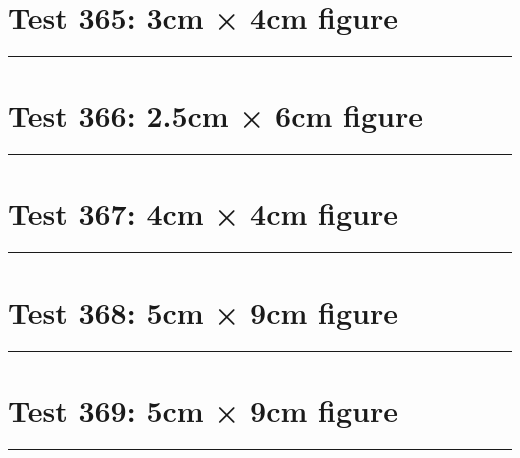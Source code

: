 \documentclass[a4paper,11pt]{article}
\begin{document}
\section*{Test 365: 3cm × 4cm figure}
\begin{swarmwrap}%
  \begin{minipage}[t]{3cm}
    \centering
    \rule{\linewidth}{4cm}
  \end{minipage}%
\end{swarmwrap}%
\swarmwrapnext
\lipsum[28]
\lipsum[29]
\lipsum[30]
\lipsum[31]
\section*{Test 366: 2.5cm × 6cm figure}
\begin{swarmwrap}%
  \begin{minipage}[t]{2cm}
    \centering
    \rule{\linewidth}{6cm}
  \end{minipage}%
\end{swarmwrap}%
\swarmwrapnext
\lipsum[46]
\lipsum[47]
\lipsum[48]
\lipsum[49]
\section*{Test 367: 4cm × 4cm figure}
\begin{swarmwrap}%
  \begin{minipage}[t]{4cm}
    \centering
    \rule{\linewidth}{4cm}
  \end{minipage}%
\end{swarmwrap}%
\swarmwrapnext
\lipsum[47]
\lipsum[48]
\lipsum[49]
\section*{Test 368: 5cm × 9cm figure}
\begin{swarmwrap}%
  \begin{minipage}[t]{5cm}
    \centering
    \rule{\linewidth}{9cm}
  \end{minipage}%
\end{swarmwrap}%
\swarmwrapnext
\lipsum[146]
\lipsum[147]
\lipsum[148]
\lipsum[149]
\lipsum[150]
\lipsum[1]
\section*{Test 369: 5cm × 9cm figure}
\begin{swarmwrap}%
  \begin{minipage}[t]{5cm}
    \centering
    \rule{\linewidth}{9cm}
  \end{minipage}%
\end{swarmwrap}%
\swarmwrapnext
\lipsum[82]
\lipsum[83]
\lipsum[84]
\lipsum[85]
\lipsum[86]
\end{document}
